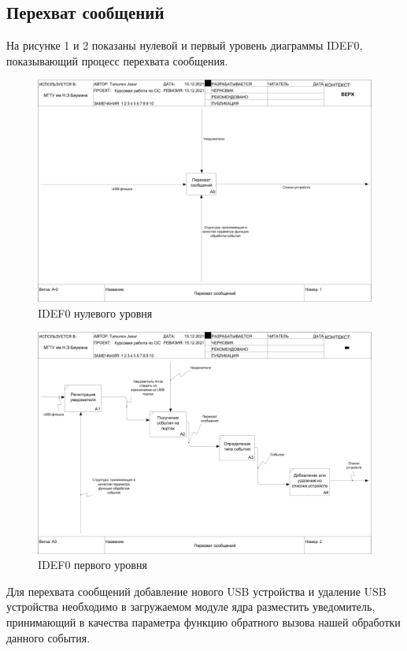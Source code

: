 \documentclass[a4paper, 10pt]{article}
\begin{document}
	\subsection{Перехват сообщений}
		\hspace*{5mm}На рисунке 1 и 2 показаны нулевой и первый уровень диаграммы IDEF0, показывающий процесс перехвата сообщения.
		\begin{figure}[h!]
			\centering
			\includegraphics[scale=0.25]{idef0}
			\centering\caption{IDEF0 нулевого уровня}
		\end{figure}
		\begin{figure}[h!]
		\centering
		\includegraphics[scale=0.25]{idef1}
		\centering\caption{IDEF0 первого уровня}
	\end{figure}

	Для перехвата сообщений добавление нового USB устройства и удаление USB устройства необходимо в загружаемом модуле ядра разместить уведомитель, принимающий в качества параметра функцию обратного вызова нашей обработки данного события.
	
\end{document}
